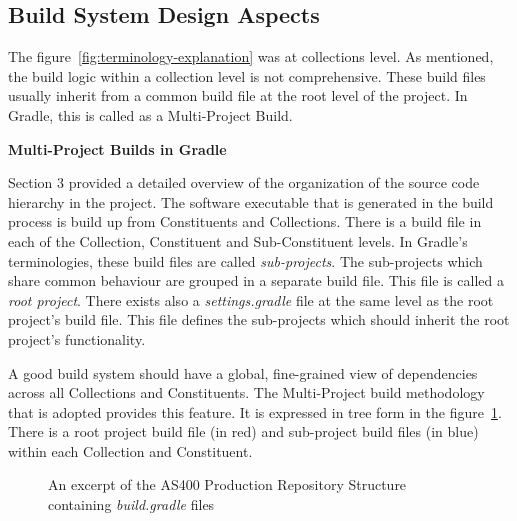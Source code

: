 \documentclass[12pt, a4paper, titlepage]{scrartcl}
\begin{document}
\subsection{Build System Design Aspects}
The figure~\ref{fig:terminology-explanation} was at collections level. As mentioned, the build logic within a collection level is not comprehensive. These build files usually inherit from a common build file at the root level of the project. In Gradle, this is called as a Multi-Project Build\cite{dockter2015gradle}.  \\
\par \textbf{Multi-Project Builds in Gradle} 
\par Section 3 provided a detailed overview of the organization of the source code hierarchy in the project. The software executable that is generated in the build process is build up from Constituents and Collections. There is a build file in each of the Collection, Constituent and Sub-Constituent levels. In Gradle's terminologies, these build files are called \emph{sub-projects}. The sub-projects which share common behaviour are grouped in a separate build file. This file is called a \emph{root project}. There exists also a \emph{settings.gradle} file at the same level as the root project's build file. This file defines the sub-projects which should inherit the root project's functionality.  
\par A good build system should have a global, fine-grained view of dependencies across all Collections and Constituents\cite{miller1998recursive}. The Multi-Project build methodology that is adopted provides this feature. It is expressed in tree form in the figure~\ref{fig:prod-repo-structure-with-gradle}. There is a root project build file (in red) and sub-project build files (in blue) within each Collection and Constituent. 
\begin{figure}[!ht]
\noindent{}
\caption{An excerpt of the AS400 Production Repository Structure containing \emph{build.gradle} files}
\label{fig:prod-repo-structure-with-gradle}
\end{figure}
\end{document}
